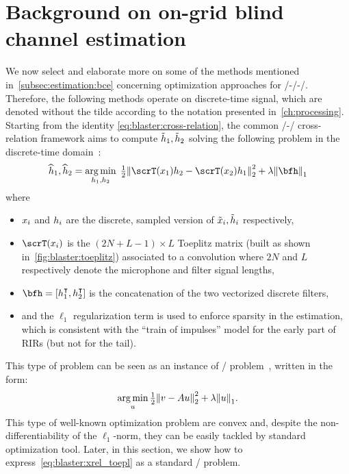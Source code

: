 \section{Background on on-grid blind channel estimation}\label{sec:blaster:background}
We now select and elaborate more on some of the methods mentioned in~\cref{subsec:estimation:bce} concerning optimization approaches for \FIR/-\SIMO/-\BCE/.
Therefore, the following methods operate on discrete-time signal, which are denoted without the tilde according to the notation presented in~\cref{ch:processing}.
Starting from the identity \cref{eq:blaster:cross-relation}, the common \SIMO/-\BCE/ cross-relation framework aims to compute $\tilde{h}_1, \tilde{h}_2$ solving the following problem in the discrete-time domain~:
\begin{equation}
    \label{eq:blaster:xrel_toepl}
    \disFilterHat_1, \disFilterHat_2
    =
    \kargmin_{\disFilter_1, \disFilter_2}
    \;
    \tfrac{1}{2}
    \kvvbar{
        \scrT(\disRecordedSignal_1) \disFilter_2
        -
        \scrT(\disRecordedSignal_2) \disFilter_1
    }_2^2
    +
    \lambda
    \kvvbar{
        \bfh
    }_1
\end{equation}
where
\begin{itemize}
    \item  $x_i$ and $h_i$ are the discrete, sampled version of $\tilde{x}_i, \tilde{h}_i$ respectively,
    \item $\scrT(\disRecordedSignal_i)$ is the $(2N+L-1) \times L$ Toeplitz matrix (built as shown in~\cref{fig:blaster:toeplitz})
    associated to a convolution where $2N$ and $L$ respectively denote the microphone and filter signal lengths,
    \item $\bfh = \klist{h_1^\intercal, h_2^\intercal}$ is the concatenation of the two vectorized discrete filters,
    \item and the $\ell_1$ regularization term is used to enforce sparsity in the estimation, which is consistent with the ``train of impulses'' model for the early part of \acp{RIR} (but not for the tail).
\end{itemize}
This type of problem can be seen as an instance of \LASSO/ problem~, written in the form:
\begin{equation}\label{eq:blaster:lasso}
    \kargmin_{u} \tfrac{1}{2} \kvvbar{v - Au}_2^2 + \lambda\kvvbar{u}_1
    .
\end{equation}
This type of well-known optimization problem are convex and, despite the non-differentiability of the $\ell_1$-norm, they can be easily tackled by standard optimization tool.
Later, in this section, we show how to express~\cref{eq:blaster:xrel_toepl} as a standard \LASSO/ problem.

